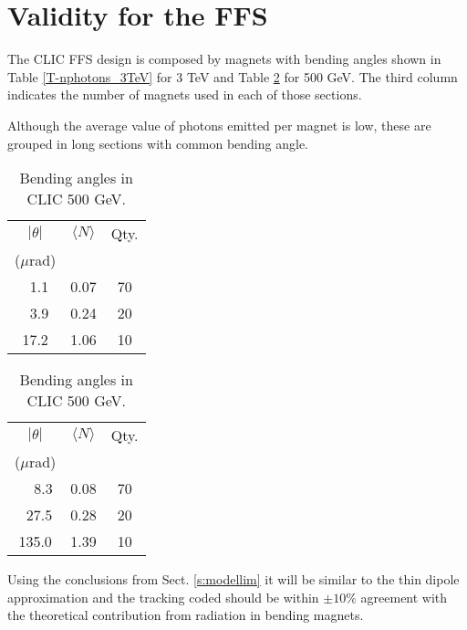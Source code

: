 \section{Validity for the FFS}
The CLIC FFS design is composed by magnets with bending angles shown in Table \ref{T-nphotons_3TeV} for 3 TeV and Table \ref{T-nphotons_500GeV} for 500 GeV.  The third column indicates the number of magnets used in each of those sections.\par 
Although the average value of photons emitted per magnet is low, these are grouped in long sections with common bending angle. \begin{table}[ht]
\begin{minipage}[b]{0.45\linewidth}\centering
\begin{tabular}{c|c|c}\hline\hline
 $|\theta|$ & $\langle N \rangle$&Qty.\\
 ($\mu$rad)&&\\\hline
 $\;\;$1.1& 0.07 &70 \\
 $\;\;$3.9& 0.24 &20 \\
 17.2& 1.06 &10\\\hline
\end{tabular}\caption{Bending angles in CLIC 3 TeV.}\label{T-nphotons_3TeV}
\end{minipage}
\hspace{0.5cm}
\begin{minipage}[b]{0.45\linewidth}
\centering
\begin{tabular}{c|c|c}\hline\hline
 $|\theta|$& $\langle N \rangle$&Qty.\\
 ($\mu$rad)&&\\\hline
 $\;\;\;\;$8.3& 0.08&70\\
 $\;\;$27.5& 0.28 &20\\
 135.0& 1.39 &10\\\hline
\end{tabular}\caption{Bending angles in CLIC 500 GeV.}\label{T-nphotons_500GeV}
\end{minipage}
\end{table}
Using the conclusions from Sect. \ref{s:modellim} it will be similar to the thin dipole approximation and the tracking coded should be within $\pm10\%$ agreement with the theoretical contribution from radiation in bending magnets.\par
